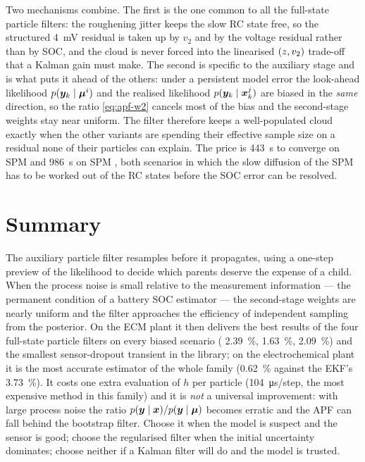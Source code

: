 Two mechanisms combine.  The first is the one common to all the full-state particle filters: the
roughening jitter keeps the slow RC state free, so the structured \SI{4}{\milli\volt} residual is
taken up by $v_2$ and by the voltage residual rather than by SOC, and the cloud is never forced into
the linearised $(z,v_2)$ trade-off that a Kalman gain must make.  The second is specific to the
auxiliary stage and is what puts it ahead of the others: under a persistent model error the
look-ahead likelihood $p(\bm{y}_k\mid\bm\mu^i)$ and the realised likelihood $p(\bm{y}_k\mid\bm{x}_k^j)$ are
biased in the \emph{same} direction, so the ratio \eqref{eq:apf-w2} cancels most of the bias and
the second-stage weights stay near uniform.  The filter therefore keeps a well-populated cloud
exactly when the other variants are spending their effective sample size on a residual none of
their particles can explain.  The price is \SI{443}{\second} to converge on SPM 
and \SI{986}{\second} on SPM , both scenarios in which the slow diffusion of the SPM has
to be worked out of the RC states before the SOC error can be resolved.

\section{Summary}
The auxiliary particle filter resamples before it propagates, using a one-step preview of the
likelihood to decide which parents deserve the expense of a child.  When the process noise is small
relative to the measurement information --- the permanent condition of a battery SOC estimator ---
the second-stage weights are nearly uniform and the filter approaches the efficiency of independent
sampling from the posterior.  On the ECM plant it then delivers the best results of the four
full-state particle filters on every biased scenario ( \SI{2.39}{\percent},
 \SI{1.63}{\percent},  \SI{2.09}{\percent}) and the smallest
sensor-dropout transient in the library; on the electrochemical plant it is the most accurate
estimator of the whole family (\SI{0.62}{\percent} against the EKF's \SI{3.73}{\percent}).  It costs
one extra evaluation of $h$ per particle (\SI{104}{\micro\second}/step, the most expensive method in
this family) and it is \emph{not} a universal improvement: with large process noise the ratio
$p(\bm{y}\mid\bm{x})/p(\bm{y}\mid\bm\mu)$ becomes erratic and the APF can fall behind the bootstrap filter.
Choose it when the model is suspect and the sensor is good; choose the regularised filter when the
initial uncertainty dominates; choose neither if a Kalman filter will do and the model is trusted.

